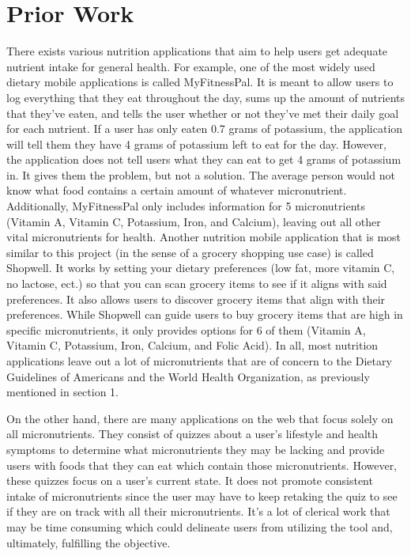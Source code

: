 \documentclass[10pt,twocolumn]{article}
\begin{document}
\section{Prior Work}
There exists various nutrition applications that aim to help users get adequate nutrient intake for general health. For example, one of the most widely used dietary mobile applications is called MyFitnessPal. It is meant to allow users to log everything that they eat throughout the day, sums up the amount of nutrients that they've eaten, and tells the user whether or not they’ve met their daily goal for each nutrient.\cite{myfitnesspal} If a user has only eaten 0.7 grams of potassium, the application will tell them they have 4 grams of potassium left to eat for the day. However, the application does not tell users what they can eat to get 4 grams of potassium in. It gives them the problem, but not a solution. The average person would not know what food contains a certain amount of whatever micronutrient. Additionally, MyFitnessPal only includes information for 5 micronutrients (Vitamin A, Vitamin C, Potassium, Iron, and Calcium), leaving out all other vital micronutrients for health. Another nutrition mobile application that is most similar to this project (in the sense of a grocery shopping use case) is called Shopwell.\cite{innit} It works by setting your dietary preferences (low fat, more vitamin C, no lactose, ect.) so that you can scan grocery items to see if it aligns with said preferences. It also allows users to discover grocery items that align with their preferences. While Shopwell can guide users to buy grocery items that are high in specific micronutrients, it only provides options for 6 of them (Vitamin A, Vitamin C, Potassium, Iron, Calcium, and Folic Acid). In all, most nutrition applications leave out a lot of micronutrients that are of concern to the Dietary Guidelines of Americans and the World Health Organization, as previously mentioned in section 1.\cite{NHANES_2020}

On the other hand, there are many applications on the web that focus solely on all micronutrients. They consist of quizzes about a user’s lifestyle and health symptoms to determine what micronutrients they may be lacking and provide users with foods that they can eat which contain those micronutrients. However, these quizzes focus on a user’s current state. It does not promote consistent intake of micronutrients since the user may have to keep retaking the quiz to see if they are on track with all their micronutrients. It’s a lot of clerical work that may be time consuming which could delineate users from utilizing the tool and, ultimately, fulfilling the objective.
\end{document}
